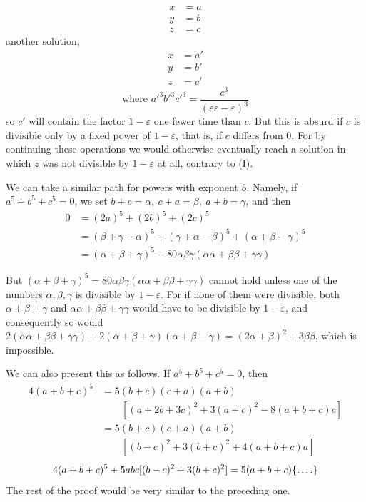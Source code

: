 %
\[
\begin{aligned}
x&=a\\
y&=b\\
z&=c
\end{aligned}
\]
another solution,
\[
\begin{aligned}
x&=a'\\
y&=b'\\
z&=c'
\end{aligned}
\]
\[
\text{where }a'^3b'^3c'^3=\frac{c^3}{(\varepsilon\varepsilon-\varepsilon)^3}
\]
so $c'$ will contain the factor $1-\varepsilon$ one fewer time than $c$. But this is absurd if $c$ is divisible only by a fixed power of $1-\varepsilon$, that is, if $c$ differs from $0$. For by continuing these operations we would otherwise eventually reach a solution in which $z$ was not divisible by $1-\varepsilon$ at all, contrary to (I).

We can take a similar path for powers with exponent $5$. Namely, if $a^5+b^5+c^5=0$, we set $b+c=\alpha,\ c+a=\beta,\ a+b=\gamma$, and then
\[
\begin{aligned}
0&=(2a)^5+(2b)^5+(2c)^5\\
&=(\beta+\gamma-\alpha)^5+(\gamma+\alpha-\beta)^5+(\alpha+\beta-\gamma)^5\\
&=(\alpha+\beta+\gamma)^5-80\alpha\beta\gamma(\alpha\alpha+\beta\beta+\gamma\gamma)
\end{aligned}
\]

But $(\alpha+\beta+\gamma)^5=80\alpha\beta\gamma(\alpha\alpha+\beta\beta+\gamma\gamma)$ cannot hold unless one of the numbers $\alpha,\beta,\gamma$ is divisible by $1-\varepsilon$. For if none of them were divisible, both $\alpha+\beta+\gamma$ and $\alpha\alpha+\beta\beta+\gamma\gamma$ would have to be divisible by $1-\varepsilon$, and consequently so would $2(\alpha\alpha+\beta\beta+\gamma\gamma)+2(\alpha+\beta+\gamma)(\alpha+\beta-\gamma)=(2\alpha+\beta)^2+3\beta\beta$, which is impossible.

We can also present this as follows. If $a^5+b^5+c^5=0$, then
\[
\begin{aligned}
4(a+b+c)^5&=5(b+c)(c+a)(a+b)\\
&\qquad[(a+2b+3c)^2+3(a+c)^2-8(a+b+c)c]\\
&=5(b+c)(c+a)(a+b)\\
&\qquad[(b-c)^2+3(b+c)^2+4(a+b+c)a]
\end{aligned}
\]
\[
4(a+b+c)^5+5abc[(b-c)^2+3(b+c)^2]=5(a+b+c)\{\mathinner{.\,.\,.\,.}\}
\]
The rest of the proof would be very similar to the preceding one.

